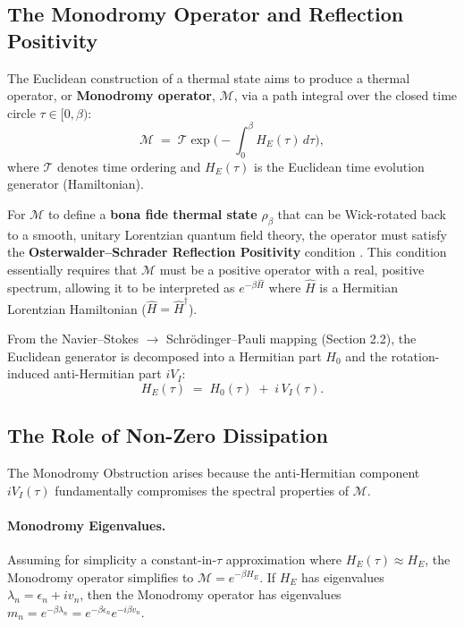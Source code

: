 \documentclass[11pt]{article}
\begin{document}
\subsection{The Monodromy Operator and Reflection Positivity\cite{OsterwalderSchrader1973}}

The Euclidean construction of a thermal state aims to produce a thermal operator, or \textbf{Monodromy operator}, $\mathcal{M}$, via a path integral over the closed time circle $\tau \in [0, \beta)$:
\begin{equation}\label{eq:monodromy_def}
    \mathcal M \;=\; \mathcal T\exp\Big(-\int_0^\beta H_E(\tau)\,d\tau\Big),
\end{equation}
where $\mathcal T$ denotes time ordering and $H_E(\tau)$ is the Euclidean time evolution generator (Hamiltonian).

For $\mathcal{M}$ to define a \textbf{bona fide thermal state} $\rho_\beta$ that can be Wick-rotated back to a smooth, unitary Lorentzian quantum field theory, the operator must satisfy the \textbf{Osterwalder--Schrader Reflection Positivity\cite{OsterwalderSchrader1973}} condition \cite{OsterwalderSchrader1973}. This condition essentially requires that $\mathcal{M}$ must be a positive operator with a real, positive spectrum, allowing it to be interpreted as $e^{-\beta \widehat{H}}$ where $\widehat{H}$ is a Hermitian Lorentzian Hamiltonian ($\widehat{H} = \widehat{H}^\dagger$).

From the Navier--Stokes $\to$ Schrödinger--Pauli mapping (Section 2.2), the Euclidean generator is decomposed into a Hermitian part $H_0$ and the rotation-induced anti-Hermitian part $iV_I$:
\begin{equation}\label{eq:HE_decomp}
    H_E(\tau) \;=\; H_0(\tau) \;+\; i\,V_I(\tau).
\end{equation}

\subsection{The Role of Non-Zero Dissipation}

The Monodromy Obstruction arises because the anti-Hermitian component $iV_I(\tau)$ fundamentally compromises the spectral properties of $\mathcal{M}$.

\paragraph{Monodromy Eigenvalues.}
Assuming for simplicity a constant-in-$\tau$ approximation where $H_E(\tau) \approx H_E$, the Monodromy operator simplifies to $\mathcal{M} = e^{-\beta H_E}$. If $H_E$ has eigenvalues $\lambda_n = \epsilon_n + i v_n$, then the Monodromy operator has eigenvalues $m_n = e^{-\beta \lambda_n} = e^{-\beta \epsilon_n} e^{-i \beta v_n}$.
\end{document}

